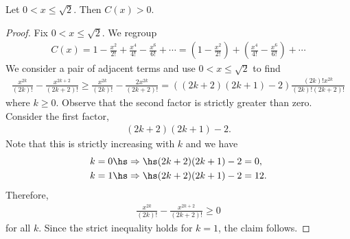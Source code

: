 \documentclass{article}
\begin{document}
\begin{claim*}
   Let $0<x\leq \sqrt{2}$. Then $C(x)>0$. 
\end{claim*}
\begin{proof}
   Fix $0<x\leq\sqrt{2}$. We regroup 
   \begin{align*}
      C(x) = 1 - \frac{x^2}{2!} + \frac{x^4}{4!} - \frac{x^6}{6!} + \cdots
      = \left(1 - \frac{x^2}{2!}\right) + \left(\frac{x^4}{4!} - \frac{x^6}{6!}\right) + \cdots
   \end{align*}
   We consider a pair of adjacent terms and use $0<x\leq\sqrt{2}$ to find 
   \begin{align*}
      \frac{x^{2k}}{(2k)!} - \frac{x^{2k+2}}{(2k+2)!}
      \geq \frac{x^{2k}}{(2k)!}-\frac{2x^{2k}}{(2k+2)!}
      = ((2k+2)(2k+1)-2)\frac{(2k)!x^{2k}}{(2k)!(2k+2)!}
   \end{align*}
   where $k\geq 0$.
   Observe that the second factor is strictly greater than zero. Consider the first factor,
   \begin{align*}
      (2k+2)(2k+1) - 2.
   \end{align*}
   Note that this is strictly increasing with $k$ and we have 
   \begin{align*}
      k=0 \hs&\Rightarrow\hs (2k+2)(2k+1) - 2 = 0,\\ 
      k=1 \hs&\Rightarrow\hs (2k+2)(2k+1) - 2 = 12.\\ 
   \end{align*}
   Therefore, 
   \begin{align*}
      \frac{x^{2k}}{(2k)!} - \frac{x^{2k+2}}{(2k+2)!} \geq 0
   \end{align*}
   for all $k$. Since the strict inequality holds for $k=1$, the claim follows.
\end{proof}
\end{document}
